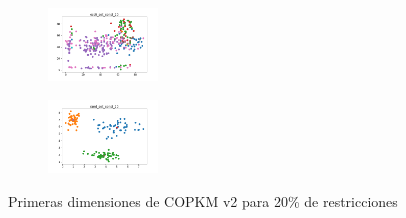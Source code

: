 \begin{figure}[H]
\begin{subfigure}
    \end{subfigure}
    \hfill
    \begin{subfigure}
        \centering
        \includegraphics[width=0.32\textwidth]{img/copkm2/ecoli_set_const_20_3773969821_clust.png}
    \end{subfigure}
    \hfill
    \begin{subfigure}
        \centering
        \includegraphics[width=0.32\textwidth]{img/copkm2/rand_set_const_20_3773969821_clust.png}
    \end{subfigure}
    \caption{Primeras dimensiones de COPKM v2 para 20\% de restricciones}
\end{figure}

\newpage